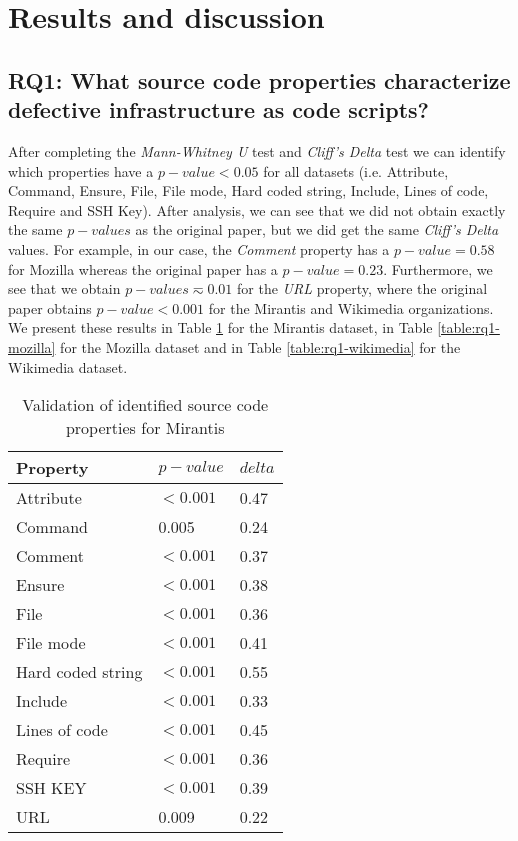 
\section{Results and discussion}
\label{sec:results}
\subsection{RQ1: What source code properties characterize defective
    infrastructure as code scripts?}
After completing the \emph{Mann-Whitney U} test and \emph{Cliff's Delta} test
we can identify which properties have a $p-value < 0.05$ for all datasets (i.e.
Attribute, Command, Ensure, File, File mode, Hard coded string, Include, Lines
of code, Require and SSH Key). After analysis, we can see that we did not obtain exactly the same $p-values$ as the original paper, but we did get the same \emph{Cliff's Delta} values. For example, in our case, the \emph{Comment} property has a $p-value = 0.58$ for Mozilla whereas the original paper has a $p-value = 0.23$. Furthermore, we see that we obtain $p-values \eqsim 0.01$ for the \emph{URL} property, where the original paper obtains $p-value < 0.001$ for the Mirantis and Wikimedia organizations. We present these results in Table \ref{table:rq1-mirantis} for the Mirantis dataset, in Table \ref{table:rq1-mozilla} for the Mozilla dataset and in Table \ref{table:rq1-wikimedia} for the Wikimedia dataset.


\begin{table}[h]
    \caption{Validation of identified source code properties for Mirantis}
    \label{table:rq1-mirantis}
    \centering
    \begin{tabular}{|l|l|l|}
        \hline
        Property          & $p-value$ & $delta$ \\ \hline
        Attribute         & $<0.001$  & 0.47    \\ \hline
        Command           & 0.005     & 0.24    \\ \hline
        Comment           & $<0.001$  & 0.37    \\ \hline
        Ensure            & $<0.001$  & 0.38    \\ \hline
        File              & $<0.001$  & 0.36    \\ \hline
        File mode         & $<0.001$  & 0.41    \\ \hline
        Hard coded string & $<0.001$  & 0.55    \\ \hline
        Include           & $<0.001$  & 0.33    \\ \hline
        Lines of code     & $<0.001$  & 0.45    \\ \hline
        Require           & $<0.001$  & 0.36    \\ \hline
        SSH KEY           & $<0.001$  & 0.39    \\ \hline
        URL               & 0.009     & 0.22    \\ \hline
    \end{tabular}
\end{table}


